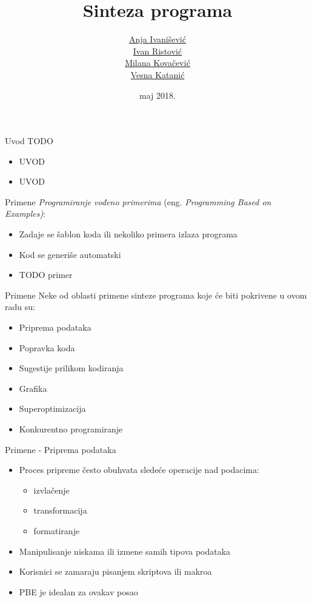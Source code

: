 \documentclass{beamer}
\title{Sinteza programa}
\author{ \href{mailto:anja.ivanisevic95@gmail.com}{Anja Ivanišević}\\ \href{mailto:mi14031@matf.bg.ac.rs}{Ivan Ristović}\\ \href{mailto:mi14042@matf.bg.ac.rs}{Milana Kovačević}\\ \href{mailto:vesna.katanic@gmail.com}{Vesna Katanić}}
\date{maj 2018.}
\begin{document}
\begin{frame}
    \titlepage
\end{frame}

\begin{frame}{Uvod}
    TODO
    \begin{itemize}
        \item UVOD
        \item UVOD
    \end{itemize}
\end{frame}

\begin{frame}{Primene}
    \emph{Programiranje vođeno primerima} (eng. \emph{Programming Based on Examples)}:
    \begin{itemize}
        \item Zadaje se šablon koda ili nekoliko primera izlaza programa
        \item Kod se generiše automatski
        \item TODO primer
    \end{itemize}
\end{frame}

\begin{frame}{Primene}
    Neke od oblasti primene sinteze programa koje će biti pokrivene u ovom radu su:
    \begin{itemize}
        \item Priprema podataka
        \item Popravka koda
        \item Sugestije prilikom kodiranja
        \item Grafika
        \item Superoptimizacija
        \item Konkurentno programiranje
    \end{itemize}
\end{frame}

\begin{frame}{Primene - Priprema podataka}
    \begin{itemize}
        \item Proces pripreme često obuhvata sledeće operacije nad podacima:
            \begin{itemize}
                \item izvlačenje
                \item transformacija
                \item formatiranje
            \end{itemize}
        \item Manipulisanje niskama ili izmene samih tipova podataka
        \item Korisnici se zamaraju pisanjem skriptova ili makroa
        \item PBE je idealan za ovakav posao
    \end{itemize}
\end{frame}
\end{document}
